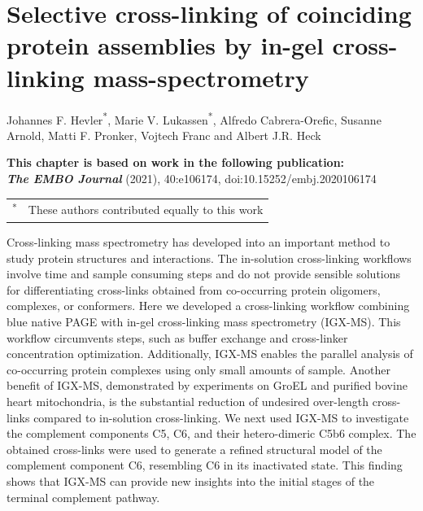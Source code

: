 \chapter{Selective cross-linking of coinciding protein assemblies by in-gel cross-linking mass-spectrometry} \label{ch-2}

{
Johannes F. Hevler\textsuperscript{*}, Marie V. Lukassen\textsuperscript{*}, Alfredo Cabrera-Orefic, Susanne Arnold, Matti F. Pronker, Vojtech Franc and Albert J.R. Heck

\begin{flushleft}
\vspace{0.3cm}
\textbf{This chapter is based on work in the following publication:}\\
\footnotesize
\textbf{\emph{The EMBO Journal}} (2021), 40:e106174, doi:10.15252/embj.2020106174\\

\footnotesize
\vspace{0.3cm}
\begin{tabular}[t]{p{}p{}}
\textsuperscript{*} & These authors contributed equally to this work\\
\end{tabular}
\end{flushleft}
}

\newpage
\begin{abstract101} 
Cross-linking mass spectrometry has developed into an important method to study protein structures and interactions. The in-solution cross-linking workflows involve time and sample consuming steps and do not provide sensible solutions for differentiating cross-links obtained from co-occurring protein oligomers, complexes, or conformers. Here we developed a cross-linking workflow combining blue native PAGE with in-gel cross-linking mass spectrometry (IGX-MS). This workflow circumvents steps, such as buffer exchange and cross-linker concentration optimization. Additionally, IGX-MS enables the parallel analysis of co-occurring protein complexes using only small amounts of sample. Another benefit of IGX-MS, demonstrated by experiments on GroEL and purified bovine heart mitochondria, is the substantial reduction of undesired over-length cross-links compared to in-solution cross-linking. We next used IGX-MS to investigate the complement components C5, C6, and their hetero-dimeric C5b6 complex. The obtained cross-links were used to generate a refined structural model of the complement component C6, resembling C6 in its inactivated state. This finding shows that IGX-MS can provide new insights into the initial stages of the terminal complement pathway.
\end{abstract101}

